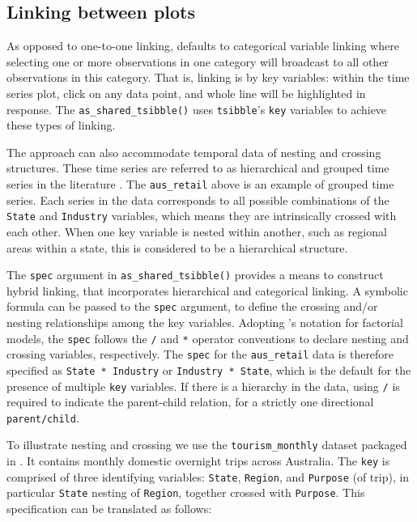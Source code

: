 \hypertarget{linking-between-plots}{%
\subsection{Linking between plots}\label{linking-between-plots}}

As opposed to one-to-one linking,  defaults to
categorical variable linking where selecting one or more observations in
one category will broadcast to all other observations in this category.
That is, linking is by key variables: within the time series plot, click
on any data point, and whole line will be highlighted in response. The
\texttt{as\_shared\_tsibble()} uses \texttt{tsibble}'s \texttt{key}
variables to achieve these types of linking.

The approach can also accommodate temporal data of nesting and crossing
structures. These time series are referred to as hierarchical and
grouped time series in the literature \citep{fpp}. The
\texttt{aus\_retail} above is an example of grouped time series. Each
series in the data corresponds to all possible combinations of the
\texttt{State} and \texttt{Industry} variables, which means they are
intrinsically crossed with each other. When one key variable is nested
within another, such as regional areas within a state, this is
considered to be a hierarchical structure.

The \texttt{spec} argument in \texttt{as\_shared\_tsibble()} provides a
means to construct hybrid linking, that incorporates hierarchical and
categorical linking. A symbolic formula can be passed to the
\texttt{spec} argument, to define the crossing and/or nesting
relationships among the key variables. Adopting \citet{Wilkinson1973}'s
notation for factorial models, the \texttt{spec} follows the \texttt{/}
and \texttt{*} operator conventions to declare nesting and crossing
variables, respectively. The \texttt{spec} for the \texttt{aus\_retail}
data is therefore specified as \texttt{State\ *\ Industry} or
\texttt{Industry\ *\ State}, which is the default for the presence of
multiple \texttt{key} variables. If there is a hierarchy in the data,
using \texttt{/} is required to indicate the parent-child relation, for
a strictly one directional \texttt{parent/child}.

To illustrate nesting and crossing we use the \texttt{tourism\_monthly}
dataset \citep{tourism} packaged in . It contains
monthly domestic overnight trips across Australia. The \texttt{key} is
comprised of three identifying variables: \texttt{State},
\texttt{Region}, and \texttt{Purpose} (of trip), in particular
\texttt{State} nesting of \texttt{Region}, together crossed with
\texttt{Purpose}. This specification can be translated as follows:


